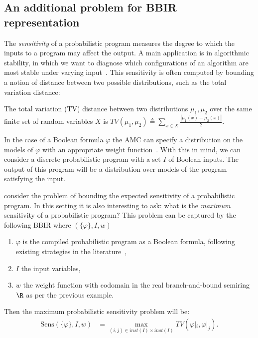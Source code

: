 \subsection{An additional problem for BBIR representation}\label{subsec:sensitivity}

The \textit{sensitivity} of a probabilistic program  
measures the degree to which the inputs to a program may affect the output.
A main application is in algorithmic stability, in 
which we want to diagnose which configurations of an algorithm are most stable 
under varying input~\citep{aguirre2021pre}.
This sensitivity is often computed by bounding a notion of distance between two
possible distributions, such as the total variation distance:

\begin{definition}
  The total variation (TV) distance between two distributions 
  $\mu_1, \mu_2$ over the same finite set of random variables $X$
  is $TV(\mu_1, \mu_2) \triangleq \sum_{x \in X} \frac{|\mu_1(x)-\mu_2(x)|}{2}$. 
\end{definition}

In the case of a Boolean formula $\varphi$
the AMC can
specify a distribution on the models of $\varphi$ with an appropriate weight 
function~\citep{de2007problog,holtzen2020scaling}. With this in mind, 
we can consider a discrete probabilistic program 
with a set
$I$ of Boolean inputs. The output of this program will be a 
distribution over models of the program satisfying the input. 

\citet{aguirre2021pre} consider the problem of bounding the expected
sensitivity of a probabilistic program.  In this setting it is 
also interesting to ask: what is the \textit{maximum}
sensitivity of a probabilistic program? This problem can be captured 
by the following BBIR where $(\{\varphi\}, I, w)$

\begin{enumerate}[leftmargin=*]
  \item $\varphi$ is the compiled probabilistic program as a Boolean formula,
  following existing strategies in the literature~\citep{holtzen2020scaling,de2007problog,saad2021sppl},
  \item $I$ the input variables,
  \item $w$ the weight function with codomain in the real branch-and-bound semiring
  $\R$ as per the previous example.
\end{enumerate}

Then the maximum probabilistic sensitivity problem will be:
\begin{equation}
  \begin{split}
  \mathrm{Sens}{(\{\varphi\}, I, w)} 
  &= \max_{(i,j) \in inst(I) \times inst(I)} TV(\varphi|_i, \varphi|_j).
\end{split}
\end{equation}